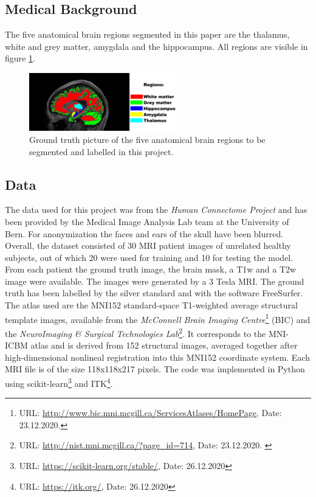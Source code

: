 \documentclass[article]{IEEEtran}
\begin{document}
\subsection{Medical Background}
	The five anatomical brain regions segmented in this paper are the thalamus, white and grey matter, amygdala and the hippocampus. All regions are visible in figure \ref{fig:e1}.

	\begin{figure}[h]
		\centering
		\includegraphics[width=0.57\textwidth]{brainRegions}
		\caption{Ground truth picture of the five anatomical brain regions to be segmented and labelled in this project.}
		\label{fig:e1}
	\end{figure}

\subsection{Data}
	The data used for this project was from the {\itshape Human Connectome Project} and has been provided by the Medical Image Analysis Lab team at the University of Bern. For anonymization the faces and ears of the skull have been blurred. 
	Overall, the dataset consisted of 30 MRI patient images of unrelated healthy subjects, out of which 20 were used for training and 10 for testing the model. 
	From each patient the ground truth image, the brain mask, a T1w and a T2w image were available. The images were generated by a 3 Tesla MRI. 
	The ground truth has been labelled by the silver standard and with the software FreeSurfer.
	The atlas used are the MNI152 standard-space T1-weighted average structural template images, available from the {\itshape McConnell Brain Imaging Centre}\footnote{URL: \url{http://www.bic.mni.mcgill.ca/ServicesAtlases/HomePage}, Date: 23.12.2020.} (BIC) and the {\itshape NeuroImaging \& Surgical Technologies Lab}\footnote{URL: \url{http://nist.mni.mcgill.ca/?page_id=714}, Date: 23.12.2020. \label{second}}. 
	It corresponds to the MNI-ICBM atlas and is derived from 152 structural images, averaged together after high-dimensional nonlineal registration into this MNI152 coordinate system.
	Each MRI file is of the size 118x118x217 pixels.\smallskip
	The code was implemented in Python using scikit-learn\footnote{URL: \url{https://scikit-learn.org/stable/}, Date: 26.12.2020} and ITK\footnote{URL: \url{https://itk.org/}, Date: 26.12.2020}.
		
\end{document}
